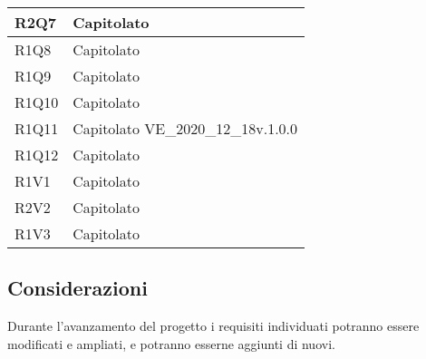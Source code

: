 \begin{center}
\begin{longtable}{|p{22mm}|p{44mm}|}
R2Q7 &
Capitolato 
\\
\hline

R1Q8 &
Capitolato 
\\
\hline

R1Q9 &
Capitolato 
\\
\hline

R1Q10 &
Capitolato 
\\
\hline

R1Q11 &
Capitolato \newline
VE\_2020\_12\_18v.1.0.0 
\\
\hline

R1Q12 &
Capitolato 
\\
\hline

R1V1 &
Capitolato 
\\
\hline

R2V2 &
Capitolato 
\\
\hline

R1V3 &
Capitolato 
\\
\hline%
		
	\end{longtable}
\end{center}

\subsection{Considerazioni}
Durante l'avanzamento del progetto i requisiti individuati potranno essere modificati e ampliati, e potranno esserne aggiunti di nuovi.